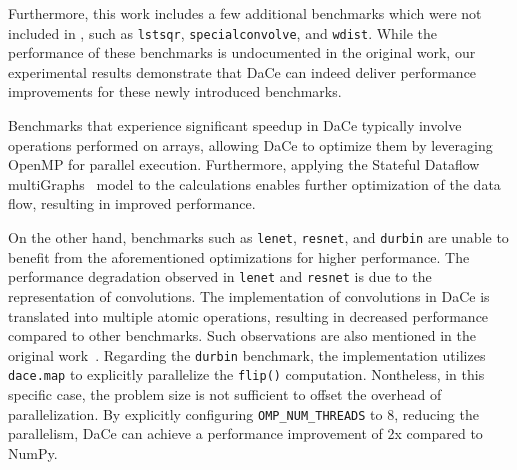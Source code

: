 Furthermore, this work includes a few additional benchmarks which were not included in \cite{dace2021}, such as \texttt{lstsqr}, \texttt{specialconvolve}, and \texttt{wdist}. While the performance of these benchmarks is undocumented in the original work, our experimental results demonstrate that DaCe can indeed deliver performance improvements for these newly introduced benchmarks.

Benchmarks that experience significant speedup in DaCe typically involve operations performed on arrays, allowing DaCe to optimize them by leveraging OpenMP for parallel execution. Furthermore, applying the Stateful Dataflow multiGraphs~\cite{SDFG} model to the calculations enables further optimization of the data flow, resulting in improved performance.

On the other hand, benchmarks such as \texttt{lenet}, \texttt{resnet}, and \texttt{durbin} are unable to benefit from the aforementioned optimizations for higher performance. The performance degradation observed in \texttt{lenet} and \texttt{resnet} is due to the representation of convolutions. The implementation of convolutions in DaCe is translated into multiple atomic operations, resulting in decreased performance compared to other benchmarks. Such observations are also mentioned in the original work~\cite{dace2021}.
Regarding the \texttt{durbin} benchmark, the implementation utilizes \texttt{dace.map} to explicitly parallelize the \texttt{flip()} computation.  Nontheless, in this specific case, the problem size is not sufficient to offset the overhead of parallelization. By explicitly configuring \texttt{OMP\_NUM\_THREADS} to 8, reducing the parallelism, DaCe can achieve a performance improvement of 2x compared to NumPy.

